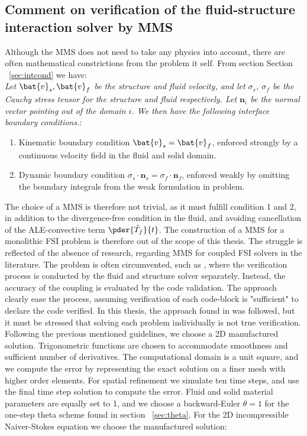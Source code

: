 \subsection{Comment on verification of the fluid-structure interaction solver by MMS}
Although the MMS does not need to take any physics into account, there are often mathematical constrictions from the problem it self. From section Section ~\ref{sec:intcond} we have: \\
\textit{Let $\bat{v}_s, \bat{v}_f$ be the structure and fluid velocity, and let $\sigma_s$, $\sigma_f$ be the Cauchy stress tensor for the structure and fluid respectively. Let $\mathbf{n}_i$ be the normal vector pointing out of the domain $i$. We then have the following interface boundary conditions.}:
\begin{enumerate}
\item Kinematic boundary condition $\bat{v}_s = \bat{v}_f$, enforced strongly by a continuous velocity field in the fluid
        and solid domain.
\item Dynamic boundary condition $\sigma_s \cdot \mathbf{n}_s = \sigma_f \cdot \mathbf{n}_f$, enforced weakly by omitting the 
        boundary integrals from the weak formulation in problem.
\end{enumerate}
The choice of a MMS is therefore not trivial, as it must fulfill condition 1 and 2, in addition to the divergence-free condition in the fluid, and avoiding cancellation of the ALE-convective term $\pder{\hat{T}_f}{t}$.  The construction of a MMS for a monolithic FSI problem is therefore out of the scope of this thesis. The struggle is reflected of the absence of research, regarding MMS for coupled FSI solvers in the literature. The problem is often circumvented, such as \cite{Sheldon2014}, where the verification process is conducted by the fluid and structure solver separately. Instead, the accuracy of the coupling is evaluated by the code validation. The approach clearly ease the process, assuming verification of each code-block is "sufficient" to declare the code verified. In this thesis, the approach found in \cite{Sheldon2014} was followed, but it must be stressed that solving each problem individually is not true verification. \\
Following the previous mentioned guidelines, we choose a 2D manufactured solution. Trigonometric functions are chosen to accommodate smoothness and sufficient number of derivatives. The computational domain is a unit square, and we compute the error by representing the exact solution on a finer mesh with higher order elements. For spatial refinement we simulate ten time steps, and use the final time step solution to compute the error. Fluid and solid material parameters are equally set to 1, and we choose a backward-Euler $\theta = 1$ for the one-step theta scheme found in section ~\ref{sec:theta}. For the 2D incompressible Naiver-Stokes equation we choose the manufactured solution:
